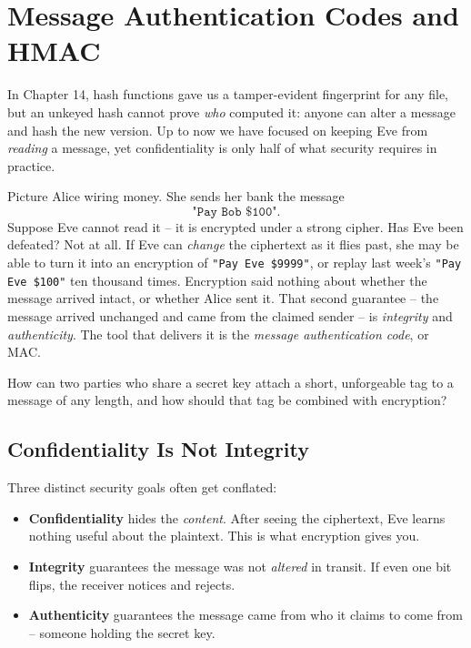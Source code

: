 \chapter{Message Authentication Codes and HMAC}

In Chapter 14, hash functions gave us a tamper-evident fingerprint for any file, but an unkeyed hash cannot prove \emph{who} computed it: anyone can alter a message and hash the new version. Up to now we have focused on keeping Eve from \emph{reading} a message, yet confidentiality is only half of what security requires in practice.

Picture Alice wiring money. She sends her bank the message
\[
\texttt{"Pay Bob \$100"}.
\]
Suppose Eve cannot read it -- it is encrypted under a strong cipher. Has Eve been defeated? Not at all. If Eve can \emph{change} the ciphertext as it flies past, she may be able to turn it into an encryption of \texttt{"Pay Eve \$9999"}, or replay last week's \texttt{"Pay Eve \$100"} ten thousand times. Encryption said nothing about whether the message arrived intact, or whether Alice sent it. That second guarantee -- the message arrived unchanged and came from the claimed sender -- is \emph{integrity} and \emph{authenticity}. The tool that delivers it is the \emph{message authentication code}, or MAC.

How can two parties who share a secret key attach a short, unforgeable tag to a message of any length, and how should that tag be combined with encryption?

\chapterline

\section{Confidentiality Is Not Integrity}
\label{ch15:conf-vs-integrity}

Three distinct security goals often get conflated:

\begin{itemize}
  \item \textbf{Confidentiality} hides the \emph{content}. After seeing the ciphertext, Eve learns nothing useful about the plaintext. This is what encryption gives you.
  \item \textbf{Integrity} guarantees the message was not \emph{altered} in transit. If even one bit flips, the receiver notices and rejects.
  \item \textbf{Authenticity} guarantees the message came from who it claims to come from -- someone holding the secret key.
\end{itemize}

